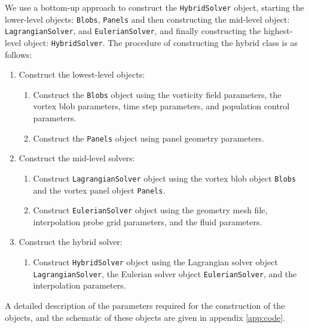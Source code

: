 We use a bottom-up approach to construct the \texttt{HybridSolver} object, starting the lower-level objects: \texttt{Blobs}, \texttt{Panels} and then constructing the mid-level object: \texttt{LagrangianSolver}, and \texttt{EulerianSolver}, and finally constructing the highest-level object: \texttt{HybridSolver}. The procedure of constructing the hybrid class is as follows:
\begin{enumerate}
	\item Construct the lowest-level objects:
		\begin{enumerate}
		\item Construct the \texttt{Blobs} object using the vorticity field parameters, the vortex blob parameters, time step parameters, and population control parameters.
		\item Construct the \texttt{Panels} object using panel geometry parameters.
		\end{enumerate}

	\item Construct the mid-level solvers:
		\begin{enumerate}
		\item Construct \texttt{LagrangianSolver} object using the vortex blob object \texttt{Blobs} and the vortex panel object \texttt{Panels}.
		\item Construct \texttt{EulerianSolver} object using the geometry mesh file, interpolation probe grid parameters, and the fluid parameters.
		\end{enumerate}
		
	\item Construct the hybrid solver:
		\begin{enumerate}
		\item Construct \texttt{HybridSolver} object using the Lagrangian solver object \texttt{LagrangianSolver}, the Eulerian solver object \texttt{EulerianSolver}, and the interpolation parameters.
		\end{enumerate}

\end{enumerate}		

A detailed description of the parameters required for the construction of the objects, and the schematic of these objects are given in appendix \ref{app:code}.
